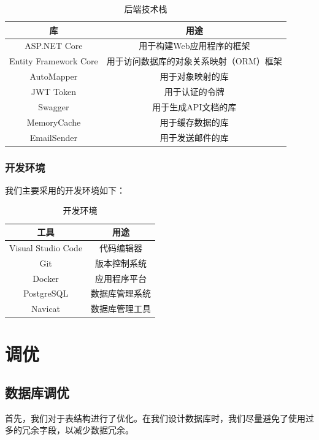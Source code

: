 \documentclass[UTF8,openany]{ctexbook}
\begin{document}
\begin{table}[H]
    \centering
    \begin{tabular}{cc}
    \toprule
    \textbf{库} &  \textbf{用途} \\ 
    \midrule
    ASP.NET Core & 用于构建Web应用程序的框架 \\
    Entity Framework Core & 用于访问数据库的对象关系映射（ORM）框架 \\
    AutoMapper & 用于对象映射的库 \\
    JWT Token & 用于认证的令牌 \\
    Swagger & 用于生成API文档的库 \\
    MemoryCache & 用于缓存数据的库 \\
    EmailSender & 用于发送邮件的库 \\
    \bottomrule
    \end{tabular}
    \caption{后端技术栈}
\end{table}

\subsection{开发环境}

我们主要采用的开发环境如下：

\begin{table}[H]
    \centering
    \begin{tabular}{cc}
    \toprule
    \textbf{工具} &  \textbf{用途} \\ 
    \midrule
    Visual Studio Code & 代码编辑器 \\
    Git & 版本控制系统 \\
    Docker & 应用程序平台 \\
    PostgreSQL & 数据库管理系统 \\
    Navicat & 数据库管理工具 \\
    \bottomrule
    \end{tabular}
    \caption{开发环境}
\end{table}


\chapter{调优}
\label{sec:tuning}

\section{数据库调优}

首先，我们对于表结构进行了优化。在我们设计数据库时，我们尽量避免了使用过多的冗余字段，以减少数据冗余。
\end{document}
